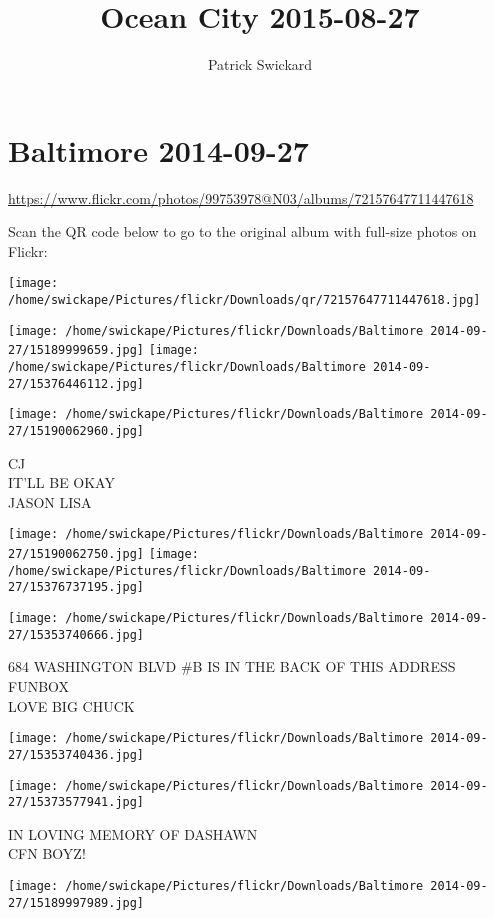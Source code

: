 \documentclass[10pt,letterpaper]{article}
\title{Ocean City 2015-08-27}
\author{Patrick Swickard}
\date{}
\begin{document}
\section*{Baltimore 2014-09-27}

\url{https://www.flickr.com/photos/99753978@N03/albums/72157647711447618}

Scan the QR code below to go to the original album with full-size photos on Flickr:

\texttt{[image: /home/swickape/Pictures/flickr/Downloads/qr/72157647711447618.jpg]}
\pagebreak

\texttt{[image: /home/swickape/Pictures/flickr/Downloads/Baltimore 2014-09-27/15189999659.jpg]}
\texttt{[image: /home/swickape/Pictures/flickr/Downloads/Baltimore 2014-09-27/15376446112.jpg]}

\vspace{0.25in}
\texttt{[image: /home/swickape/Pictures/flickr/Downloads/Baltimore 2014-09-27/15190062960.jpg]}

CJ\\
IT'LL BE OKAY\\
JASON LISA
\pagebreak

\texttt{[image: /home/swickape/Pictures/flickr/Downloads/Baltimore 2014-09-27/15190062750.jpg]}
\texttt{[image: /home/swickape/Pictures/flickr/Downloads/Baltimore 2014-09-27/15376737195.jpg]}

\vspace{0.25in}
\texttt{[image: /home/swickape/Pictures/flickr/Downloads/Baltimore 2014-09-27/15353740666.jpg]}

684 WASHINGTON BLVD \#B IS IN THE BACK OF THIS ADDRESS\\
FUNBOX\\
LOVE BIG CHUCK
\pagebreak

\texttt{[image: /home/swickape/Pictures/flickr/Downloads/Baltimore 2014-09-27/15353740436.jpg]}

\vspace{0.25in}
\texttt{[image: /home/swickape/Pictures/flickr/Downloads/Baltimore 2014-09-27/15373577941.jpg]}

IN LOVING MEMORY OF DASHAWN\\
CFN BOYZ!
\pagebreak

\texttt{[image: /home/swickape/Pictures/flickr/Downloads/Baltimore 2014-09-27/15189997989.jpg]}
\end{document}
